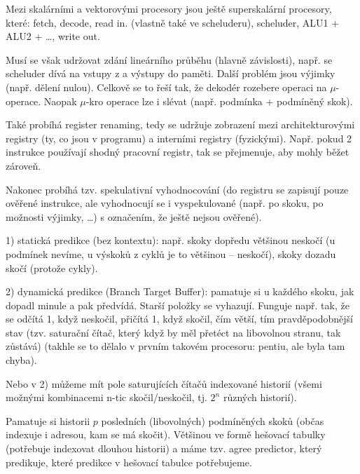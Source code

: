 \documentclass[12pt]{article}                   %
\begin{document}
        \begin{definice}
            Mezi skalárními a vektorovými procesory jsou ještě superskalární procesory, které: fetch, decode, read in. (vlastně také ve scheluderu), scheluder, ALU1 + ALU2 + …, write out.

            Musí se však udržovat zdání lineárního průběhu (hlavně závislosti), např. se scheluder dívá na vstupy z a výstupy do paměti. Další problém jsou výjimky (např. dělení nulou). Celkově se to řeší tak, že dekodér rozebere operaci na $\mu$-operace. Naopak $\mu$-kro operace lze i slévat (např. podmínka + podmíněný skok).

            Také probíhá register renaming, tedy se udržuje zobrazení mezi architekturovými registry (ty, co jsou v programu) a interními registry (fyzickými). Např. pokud 2 instrukce používají shodný pracovní registr, tak se přejmenuje, aby mohly běžet zároveň.

            Nakonec probíhá tzv. spekulativní vyhodnocování (do registru se zapisují pouze ověřené instrukce, ale vyhodnocují se i vyspekulované (např. po skoku, po možnosti výjimky, …) s označením, že ještě nejsou ověřené).
        \end{definice}

        \begin{definice}
            1) statická predikce (bez kontextu): např. skoky dopředu většinou neskočí (u podmínek nevíme, u výskoků z cyklů je to většinou -- neskočí), skoky dozadu skočí (protože cykly).

            2) dynamická predikce (Branch Target Buffer): pamatuje si u každého skoku, jak dopadl minule a pak předvídá. Starší položky se vyhazují. Funguje např. tak, že se odčítá 1, když neskočil, přičítá 1, když skočil, čím větší, tím pravděpodobnější stav (tzv. saturační čítač, který když by měl přetéct na libovolnou stranu, tak zůstává) (takhle se to dělalo v prvním takovém procesoru: pentiu, ale byla tam chyba).

            Nebo v 2) můžeme mít pole saturujících čítačů indexované historií (všemi možnými kombinacemi n-tic skočil/neskočil, tj. $2^n$ různých historií).
        \end{definice}


        \begin{definice}
            Pamatuje si historii $p$ posledních (libovolných) podmíněných skoků (občas indexuje i adresou, kam se má skočit). Většinou ve formě hešovací tabulky (potřebuje indexovat dlouhou historii) a máme tzv. agree predictor, který predikuje, které predikce v hešovací tabulce potřebujeme.
        \end{definice}
\end{document}
